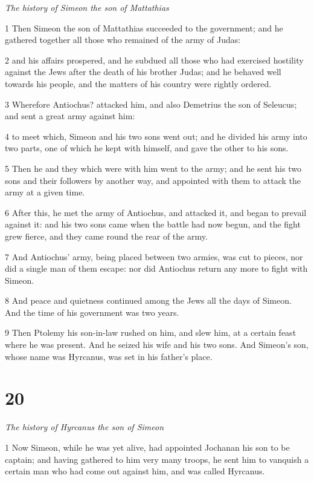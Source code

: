 \par \textit{The history of Simeon the son of Mattathias}

1 Then Simeon the son of Mattathias succeeded to the government; and he gathered together all those who remained of the army of Judas: 

2 and his affairs prospered, and he subdued all those who had exercised hostility against the Jews after the death of his brother Judas; and he behaved well towards his people, and the matters of his country were rightly ordered. 

3 Wherefore Antiochus? attacked him, and also Demetrius the son of Seleucus; and sent a great army against him: 

4 to meet which, Simeon and his two sons went out; and he divided his army into two parts, one of which he kept with himself, and gave the other to his sons. 

5 Then he and they which were with him went to the army; and he sent his two sons and their followers by another way, and appointed with them to attack the army at a given time. 

6 After this, he met the army of Antiochus, and attacked it, and began to prevail against it: and his two sons came when the battle had now begun, and the fight grew fierce, and they came round the rear of the army. 

7 And Antiochus’ army, being placed between two armies, was cut to pieces, nor did a single man of them escape: nor did Antiochus return any more to fight with Simeon. 

8 And peace and quietness continued among the Jews all the days of Simeon. And the time of his government was two years. 

9 Then Ptolemy his son-in-law rushed on him, and slew him, at a certain feast where he was present. And he seized his wife and his two sons. And Simeon’s son, whose name was Hyrcanus, was set in his father’s place. 

\par [Here ends the history as given in the two books usually attached to our Bibles.]

\chapter{20}

\par \textit{The history of Hyrcanus the son of Simeon}

1 Now Simeon, while he was yet alive, had appointed Jochanan his son to be captain; and having gathered to him very many troops, he sent him to vanquish a certain man who had come out against him, and was called Hyrcanus. 


